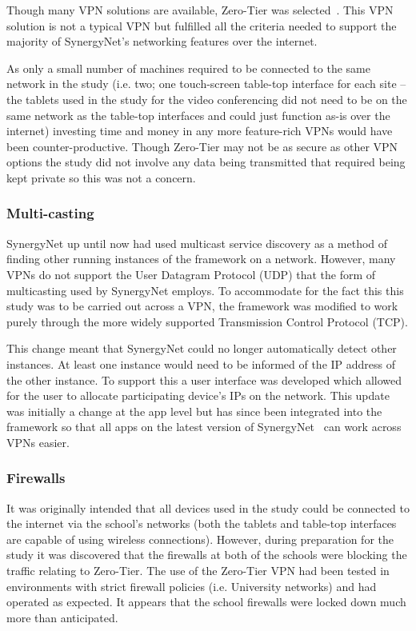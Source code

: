 \documentclass[a4paper,11pt]{article}
\begin{document}
Though many VPN solutions are available, Zero-Tier was selected~\cite{zerotier:2016}.
This VPN solution is not a typical VPN but fulfilled all the criteria needed to support the majority of SynergyNet’s networking features over the internet.

As only a small number of machines required to be connected to the same network in the study (i.e.
two; one touch-screen table-top interface for each site – the tablets used in the study for the video conferencing did not need to be on the same network as the table-top interfaces and could just function as-is over the internet) investing time and money in any more feature-rich VPNs would have been counter-productive.
Though Zero-Tier may not be as secure as other VPN options the study did not involve any data being transmitted that required being kept private so this was not a concern.

\subsubsection{Multi-casting}

SynergyNet up until now had used multicast service discovery as a method of finding other running instances of the framework on a network.
However, many VPNs do not support the User Datagram Protocol (UDP) that the form of multicasting used by SynergyNet employs.
To accommodate for the fact this this study was to be carried out across a VPN, the framework was modified to work purely through the more widely supported Transmission Control Protocol (TCP).

This change meant that SynergyNet could no longer automatically detect other instances.
At least one instance would need to be informed of the IP address of the other instance.
To support this a user interface was developed which allowed for the user to allocate participating device’s IPs on the network.
This update was initially a change at the app level but has since been integrated into the framework so that all apps on the latest version of SynergyNet~\cite{hatch:2011} can work across VPNs easier.

\subsubsection{Firewalls}

It was originally intended that all devices used in the study could be connected to the internet via the school’s networks (both the tablets and table-top interfaces are capable of using wireless connections).
However, during preparation for the study it was discovered that the firewalls at both of the schools were blocking the traffic relating to Zero-Tier.
The use of the Zero-Tier VPN had been tested in environments with strict firewall policies (i.e.
University networks) and had operated as expected.
It appears that the school firewalls were locked down much more than anticipated.
\end{document}
